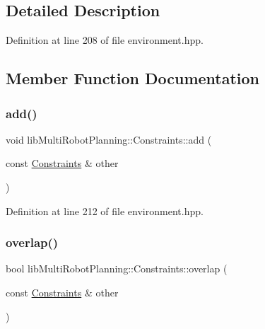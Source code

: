\subsection{Detailed Description}


Definition at line 208 of file environment.\+hpp.



\subsection{Member Function Documentation}
\mbox{\label{structlib_multi_robot_planning_1_1_constraints_a62073ccf7e07c6ad80ec809affdf3a81}} 
\subsubsection{\texorpdfstring{add()}{add()}}
{\footnotesize\ttfamily void lib\+Multi\+Robot\+Planning\+::\+Constraints\+::add (\begin{DoxyParamCaption}\item[{const \hyperlink{structlib_multi_robot_planning_1_1_constraints}{Constraints} \&}]{other }\end{DoxyParamCaption})\hspace{0.3cm}{\ttfamily [inline]}}



Definition at line 212 of file environment.\+hpp.

\mbox{\label{structlib_multi_robot_planning_1_1_constraints_a572feb308aed241ee52970e0ac2a1c16}} 
\subsubsection{\texorpdfstring{overlap()}{overlap()}}
{\footnotesize\ttfamily bool lib\+Multi\+Robot\+Planning\+::\+Constraints\+::overlap (\begin{DoxyParamCaption}\item[{const \hyperlink{structlib_multi_robot_planning_1_1_constraints}{Constraints} \&}]{other }\end{DoxyParamCaption})\hspace{0.3cm}{\ttfamily [inline]}}



